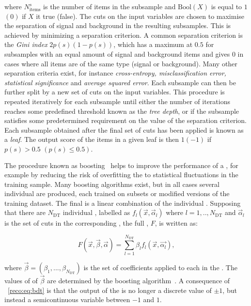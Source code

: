 where $N_{\textrm{items}}^{s}$ is the number of items in the subsample and $\textrm{Bool}(X)$ is equal to $1$ $(0)$ if $X$ it true (false). 
The cuts on the input variables are chosen to maximise the separation of signal and background in the resulting subsamples. This is achieved by minimizing a separation criterion. 
A common separation criterion is the \emph{Gini index} $2p(s)(1-p(s))$, which has a maximum at $0.5$ for subsamples with an equal amount of signal and background items and gives $0$ in cases where all items are of the same type (signal or background). Many other separation criteria exist, for instance \emph{cross-entropy, misclassification error, statistical significance} and \emph{average squared error}.  
Each subsample can then be further split by a new set of cuts on the input variables. This procedure is repeated iteratively for each subsample until either the number of iterations reaches some predefined threshold known as the \emph{tree depth}, or if the subsample satisfies some predetermined requirement on the value of the separation criterion. Each subsample obtained after the final set of cuts has been applied is known as a \emph{leaf}. The output score of the items in a given leaf is then $1 (-1)$ if $p(s)>0.5$ $(p(s)\leq0.5)$.

The procedure known as boosting~\cite{friedman2001} helps to improve the performance of a \DT, for example by reducing the risk of overfitting the \DT to statistical fluctuations in the training sample. Many boosting algorithms exist, but in all cases several individual \DT\s are produced, each trained on subsets or modified versions of the training dataset. The final \BDT is a linear combination of the individual \DT\s. Supposing that there are $N_{\textrm{DT}}$ individual \DT\s, labelled as $f_{l}(\vec{x},\vec{\alpha}_{l})$ where $l=1,..,N_{\textrm{DT}}$ and $\vec{\alpha}_{l}$ is the set of cuts in the corresponding \DT, the full \BDT, $F$, is written as:

\begin{equation}
\label{reco:eq:bdt}
F(\vec{x},\vec{\beta},\vec{\alpha}) = \sum_{l=1}^{N_{\textrm{DT}}} \beta_{l} f_{l}(\vec{x},\vec{\alpha_{l}}), 
\end{equation}

where $\vec{\beta}=(\beta_{1},...,\beta_{N_{\textrm{DT}}})$ is the set of coefficients applied to each \DT in the \BDT. The values of of $\vec{\beta}$ are determined by the boosting algorithm~\cite{friedman2009,TMVA}. A consequence of \Eq~\ref{reco:eq:bdt} is that the output of the \BDT is no longer a discrete value of $\pm1$, but instead a semicontinuous variable between $-1$ and $1$. 

